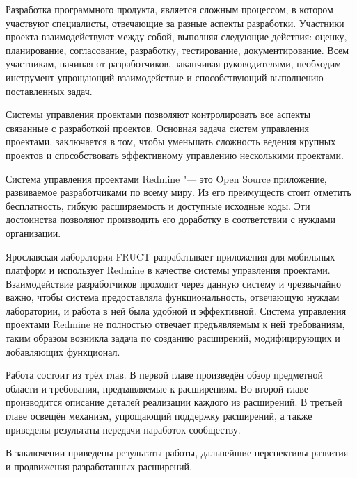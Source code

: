 Разработка программного продукта, является сложным процессом, в котором
участвуют специалисты, отвечающие за разные аспекты разработки. Участники
проекта взаимодействуют между собой, выполняя следующие действия: оценку,
планирование, согласование, разработку, тестирование, документирование.  Всем
участникам, начиная от разработчиков, заканчивая руководителями, необходим
инструмент упрощающий взаимодействие и способствующий выполнению поставленных
задач.

Системы управления проектами позволяют контролировать все аспекты связанные с
разработкой проектов. Основная задача систем управления проектами, заключается в
том, чтобы уменьшать сложность ведения крупных проектов и способствовать
эффективному управлению несколькими проектами.

Система управления проектами Redmine "--- это Open Source приложение,
развиваемое разработчиками по всему миру. Из его преимуществ стоит
отметить бесплатность, гибкую расширяемость и доступные исходные коды. Эти
достоинства позволяют производить его доработку в соответствии с нуждами
организации.

Ярославская лаборатория FRUCT разрабатывает приложения для мобильных
платформ и использует Redmine в качестве системы управления проектами.
Взаимодействие разработчиков проходит через данную систему и чрезвычайно важно,
чтобы система предоставляла функциональность, отвечающую нуждам лаборатории, и
работа в ней была удобной и эффективной. Система управления проектами Redmine
не полностью отвечает предъявляемым к ней требованиям, таким образом возникла
задача по созданию расширений, модифицирующих и добавляющих функционал.

Работа состоит из трёх глав. В первой главе произведён обзор предметной области
и требования, предъявляемые к расширениям. Во второй главе производится
описание деталей реализации каждого из расширений. В третьей главе освещён
механизм, упрощающий поддержку расширений, а также приведены результаты
передачи наработок сообществу.

В заключении приведены результаты работы, дальнейшие перспективы развития и
продвижения разработанных расширений.

